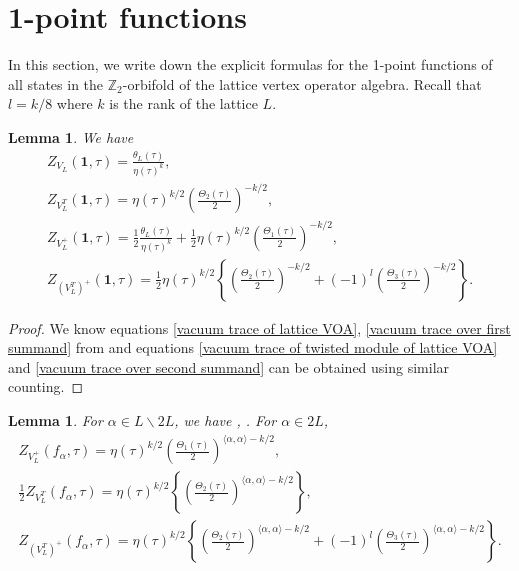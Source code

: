 \documentclass[pdftex]{sigma}
\numberwithin{equation}{section}
\newtheorem{Lemma}[Theorem]{Lemma}
\theoremstyle{definition}
\begin{document}
\section{1-point functions}\label{sec5}

In this section, we write down the explicit formulas for the 1-point functions of all states in the $\mathbb{Z}_2$-orbifold of the lattice vertex operator algebra. Recall that $l=k/8$ where $k$ is the rank of the lattice $L$.

\begin{Lemma}\label{vacuum traces}
 We have
 \begin{gather}\label{vacuum trace of lattice VOA}
 Z_{V_L}(\mathbf{1},\tau)=\frac{\theta_L(\tau)}{\eta(\tau)^k},
\\
\label{vacuum trace of twisted module of lattice VOA}
 Z_{V_L^T}(\mathbf{1},\tau)=\eta(\tau)^{k/2}\left(\frac{\Theta_2(\tau)}{2}\right)^{-k/2},
\\
\label{vacuum trace over first summand}
 Z_{V_L^+}(\mathbf{1},\tau)=\frac{1}{2}\frac{\theta_L(\tau)}{\eta(\tau)^k}+\frac{1}{2}\eta(\tau)^{k/2}\left(\frac{\Theta_1(\tau)}{2}\right)^{-k/2},
\\
\label{vacuum trace over second summand}
 Z_{(V_L^T)^+}(\mathbf{1},\tau)=\frac{1}{2}\eta(\tau)^{k/2} \left\{\left(\frac{\Theta_2(\tau)}{2}\right)^{-k/2}+(-1)^l\left(\frac{\Theta_3(\tau)}{2}\right)^{-k/2}\right\}.
 \end{gather}
\end{Lemma}

\begin{proof}
 We know equations \eqref{vacuum trace of lattice VOA}, \eqref{vacuum trace over first summand} from \cite[Lemma 7]{Mason20231-PointAlgebras} and equations \eqref{vacuum trace of twisted module of lattice VOA} and \eqref{vacuum trace over second summand} can be obtained using similar counting.
\end{proof}

\begin{Lemma}\label{lattice element traces}
For $\alpha\in L\backslash 2L$, we have
, .
For $\alpha\in 2L$,
\begin{gather*}%
 Z_{V_L^+}(f_{\alpha},\tau)=\eta(\tau)^{k/2}\left(\frac{\Theta_1(\tau)}{2}\right)^{\langle\alpha,\alpha\rangle-k/2},
\\
 \frac{1}{2}Z_{V_L^T}(f_{\alpha},\tau)=\eta(\tau)^{k/2}\left\{\left(\frac{\Theta_2(\tau)}{2}\right)^{\langle\alpha,\alpha\rangle-k/2}\right\},
\\
 Z_{(V_L^T)^+}(f_{\alpha},\tau)=\eta(\tau)^{k/2}\left\{\left(\frac{\Theta_2(\tau)}{2}\right)^{\langle\alpha,\alpha\rangle-k/2}+(-1)^l\left(\frac{\Theta_3(\tau)}{2}\right)^{\langle\alpha,\alpha\rangle-k/2}\right\}.
\end{gather*}
\end{Lemma}
\end{document}

